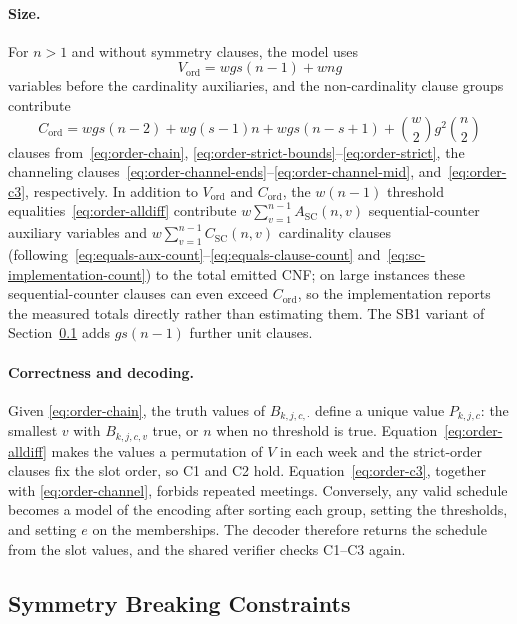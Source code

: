 \documentclass[a4paper,fleqn]{cas-sc}
\begin{document}
\paragraph{Size.}
For $n>1$ and without symmetry clauses, the model uses
\begin{equation}
 V_{\mathrm{ord}} = wgs(n-1)+wng
 \label{eq:order-vars}
\end{equation}
variables before the cardinality auxiliaries, and the non-cardinality clause groups
contribute
\begin{equation}
 C_{\mathrm{ord}} = wgs(n-2)+wg(s-1)n+wgs(n-s+1)
   +\binom{w}{2}g^2\binom{n}{2}
 \label{eq:order-clauses}
\end{equation}
clauses from~\eqref{eq:order-chain}, \eqref{eq:order-strict-bounds}--\eqref{eq:order-strict}, the
channeling clauses~\eqref{eq:order-channel-ends}--\eqref{eq:order-channel-mid}, and~\eqref{eq:order-c3}, respectively. In addition to $V_{\mathrm{ord}}$ and $C_{\mathrm{ord}}$, the
$w(n-1)$ threshold equalities~\eqref{eq:order-alldiff} contribute $w\sum_{v=1}^{n-1} A_{\mathrm{SC}}(n,v)$ sequential-counter auxiliary variables and $w\sum_{v=1}^{n-1} C_{\mathrm{SC}}(n,v)$ cardinality clauses (following~\eqref{eq:equals-aux-count}--\eqref{eq:equals-clause-count} and~\eqref{eq:sc-implementation-count}) to the total emitted CNF; on large instances these sequential-counter clauses can even exceed $C_{\mathrm{ord}}$, so the implementation reports the measured totals directly rather than estimating them. The SB1 variant of
Section~\ref{sec:symmetry_breaking} adds $gs(n-1)$ further unit clauses.

\paragraph{Correctness and decoding.}
Given \eqref{eq:order-chain}, the truth values of
$B_{k,j,c,\cdot}$ define a unique value $P_{k,j,c}$: the smallest $v$
with $B_{k,j,c,v}$ true, or $n$ when no threshold is true.
Equation~\eqref{eq:order-alldiff} makes the values a permutation of $V$
in each week and the strict-order clauses fix the slot order, so C1 and
C2 hold. Equation~\eqref{eq:order-c3}, together with
\eqref{eq:order-channel}, forbids repeated meetings. Conversely, any
valid schedule becomes a model of the encoding after sorting each
group, setting the thresholds, and setting $e$ on the memberships. The
decoder therefore returns the schedule from the slot values, and the
shared verifier checks C1--C3 again.

\subsection{Symmetry Breaking Constraints}
\label{sec:symmetry_breaking}
\end{document}
